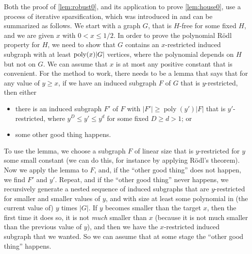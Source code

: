 \documentclass[11pt,reqno,a4paper]{amsart}
\newcommand{\poly}{\operatorname{poly}}
\DeclarePairedDelimiter\abs{\lvert}{\rvert}%
\begin{document}
	Both the proof of \cref{lem:robust0}, and its application to prove \cref{lem:house0}, use a process of 
	iterative sparsification, which was introduced in \cite{density3,density4}
	and can be summarized as follows.
	We start with a graph $G$, that is $H$-free for some fixed $H$, and we are given $x$ with $0<x\le 1/2$. In order to prove
	the polynomial R\"odl property for $H$, we need to show that $G$ contains an $x$-restricted induced subgraph with at least 
	$\poly(x)\abs G$ vertices, where the polynomial depends on $H$ but not on $G$.  We can 
	assume that $x$ is at most any positive constant that is convenient. For the method to work, there needs to be a lemma that says 
	that for any value of $y\ge x$, if we have an induced subgraph $F$ of $G$ that is $y$-restricted, then either 
	\begin{itemize}
		\item there is an induced subgraph $F'$ of $F$ with $|F'|\ge \poly(y') |F|$ that is $y'$-restricted, where $y^D\le y'\le y^d$ 
		for some fixed $D\ge d>1$; or
		\item some other good thing happens.
	\end{itemize}
	
	To use the lemma, we choose a subgraph $F$ of linear size that is $y$-restricted for $y$ some small constant 
	(we can do this, for instance by applying R\"odl's theorem). Now we apply the lemma to $F$, and, if the ``other good thing'' does 
	not happen, we find $F'$ and $y'$. Repeat, and if the ``other good thing'' never happens, we
	recursively generate a nested sequence of induced subgraphs
	that are $y$-restricted for smaller and smaller values of $y$, and with size at least some polynomial in (the current value of) $y$
	times $|G|$. If $y$ becomes smaller than the target $x$, then the first time it does so, it is not {\em much} smaller than 
	$x$ (because it is not much smaller than the previous value of $y$), and then we have the $x$-restricted induced subgraph that we 
	wanted. So we can assume that at some stage the ``other good thing'' happens. 
	
\end{document}
